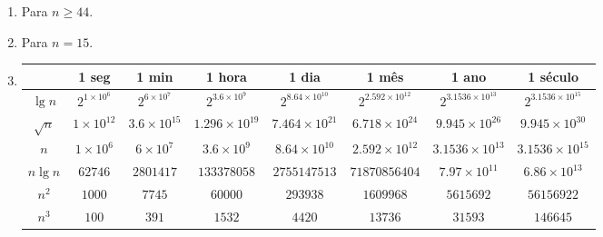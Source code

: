 \documentclass{article}
\begin{document}
\begin{enumerate}
\begin{enumerate}
		\item \begin{proof}
		$$\sum_{i=0}^n i^3 = \frac{n^2(n+1)^2}{4}$$

		Passo base ($n=0$):
		$$0^3=\frac{0^2(0+1)^2}{4}$$

		Passo indutivo:
		\begin{align*}
			\frac{n^2(n+1)^2}{4} + (n+1)^3 &= \frac{(n+1)^2(n+2)^2}{4} \\
			\frac{(n+1)^2(n^2 + 4(n+1))}{4} &= \\
			n^2 + 4n + 4 &= (n+2)^2 \\
			n^2 + 4n + 4 &= n^2 + 4n + 4
		\end{align*}
		\end{proof}
	\end{enumerate}

	\item Para $n \geq 44$.

	\item Para $n = 15$.

	\item \begin{tabular} {|c|c|c|c|c|c|c|c|}
	\hline
	& 1 seg & 1 min & 1 hora & 1 dia & 1 mês & 1 ano & 1 século \\ \hline
	$\lg n$ & $2^{1\times10^6}$ & $2^{6\times10^7}$ & $2^{3.6\times10^9}$ &
	$2^{8.64\times10^{10}}$ & $2^{2.592\times10^{12}}$ &
	$2^{3.1536\times10^{13}}$ & $2^{3.1536\times10^{15}}$ \\ \hline

	$\sqrt{n}$ & $1\times10^{12}$ & $3.6\times10^{15}$ & $1.296\times10^{19}$ &
	$7.464\times10^{21}$ & $6.718\times10^{24}$ & $9.945\times10^{26}$ &
	$9.945\times10^{30}$ \\ \hline

	$n$ & $1\times10^6$ & $6\times10^7$ & $3.6\times10^9$ & $8.64\times10^{10}$
	& $2.592\times10^{12}$ & $3.1536\times10^{13}$ & $3.1536\times10^{15}$ \\
	\hline

	$n \lg n$ & $62746$ & $2801417$ & $133378058$ & $2755147513$ &
	$71870856404$ & $7.97\times10^{11}$ & $6.86\times10^{13}$ \\ \hline

	$n^2$ & $1000$ & $7745$ & $60000$ & $293938$ & $1609968$ & $5615692$ &
	$56156922$ \\ \hline

	$n^3$ & $100$ & $391$ & $1532$ & $4420$ & $13736$ & $31593$ & $146645$ \\
	\hline


\end{tabular}
\end{enumerate}
\end{document}

